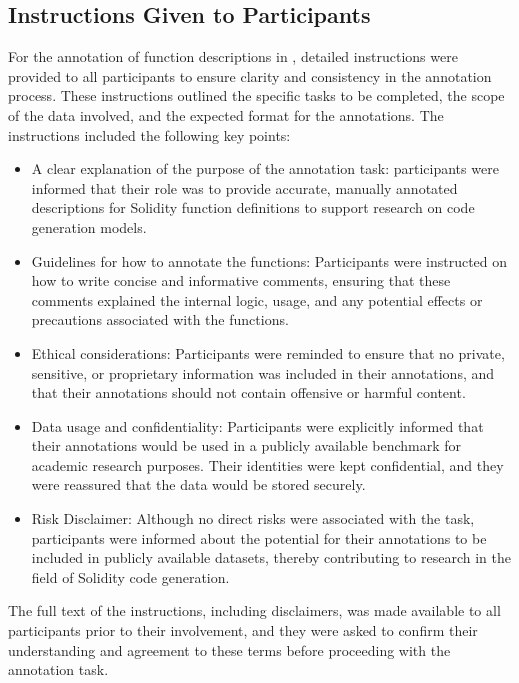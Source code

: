 \subsection{Instructions Given to Participants}

For the annotation of function descriptions in \datasetname, detailed instructions were provided to all participants to ensure clarity and consistency in the annotation process. These instructions outlined the specific tasks to be completed, the scope of the data involved, and the expected format for the annotations. The instructions included the following key points:
\begin{itemize}[leftmargin=*]
    \item A clear explanation of the purpose of the annotation task: participants were informed that their role was to provide accurate, manually annotated descriptions for Solidity function definitions to support research on code generation models.
    \item Guidelines for how to annotate the functions: Participants were instructed on how to write concise and informative comments, ensuring that these comments explained the internal logic, usage, and any potential effects or precautions associated with the functions.
    \item Ethical considerations: Participants were reminded to ensure that no private, sensitive, or proprietary information was included in their annotations, and that their annotations should not contain offensive or harmful content.
    \item Data usage and confidentiality: Participants were explicitly informed that their annotations would be used in a publicly available benchmark for academic research purposes. Their identities were kept confidential, and they were reassured that the data would be stored securely.
    \item Risk Disclaimer: Although no direct risks were associated with the task, participants were informed about the potential for their annotations to be included in publicly available datasets, thereby contributing to research in the field of Solidity code generation.
\end{itemize}


The full text of the instructions, including disclaimers, was made available to all participants prior to their involvement, and they were asked to confirm their understanding and agreement to these terms before proceeding with the annotation task.




